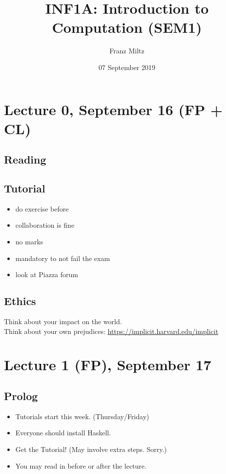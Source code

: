 \documentclass{article}
\begin{document}
\title{INF1A: Introduction to Computation (SEM1)}
\author{Franz Miltz}
\date{07 September 2019}
\maketitle
\tableofcontents
\pagebreak
\section{Lecture 0, September 16 (FP + CL)}
\subsection{Reading}
\subsection{Tutorial}
\begin{itemize}
    \item do exercise before
    \item collaboration is fine
    \item no marks
    \item mandatory to not fail the exam
\end{itemize}
\begin{itemize}
    \item look at Piazza forum
\end{itemize}
\subsection{Ethics}
Think about your impact on the world.\\
Think about your own prejudices:
\url{https://implicit.harvard.edu/implicit}
\section{Lecture 1 (FP), September 17}
\subsection{Prolog}
\begin{itemize}
    \item Tutorials start this week. (Thursday/Friday)
    \item Everyone should install Haskell.
    \item Get the Tutorial! (May involve extra steps. Sorry.)
    \item You may read in before or after the lecture.
\end{itemize}
\end{document}
